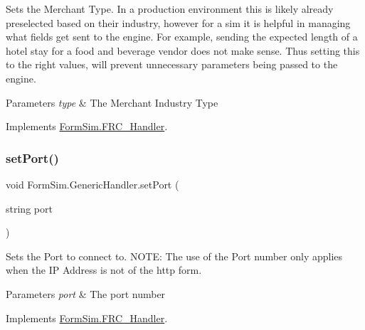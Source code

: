 Sets the Merchant Type. In a production environment this is likely already preselected based on their industry, however for a sim it is helpful in managing what fields get sent to the engine. For example, sending the expected length of a hotel stay for a food and beverage vendor does not make sense. Thus setting this to the right values, will prevent unnecessary parameters being passed to the engine. 


\begin{DoxyParams}{Parameters}
{\em type} & The Merchant Industry Type\\
\hline
\end{DoxyParams}


Implements \mbox{\hyperlink{interface_form_sim_1_1_f_r_c___handler_a23a2917fb9455954723cd3982b31b76c}{Form\+Sim.\+F\+R\+C\+\_\+\+Handler}}.

\mbox{\label{class_form_sim_1_1_generic_handler_ad22f25ee6f474e2ac46361add5ca7f97}} 
\subsubsection{\texorpdfstring{set\+Port()}{setPort()}}
{\footnotesize\ttfamily void Form\+Sim.\+Generic\+Handler.\+set\+Port (\begin{DoxyParamCaption}\item[{string}]{port }\end{DoxyParamCaption})\hspace{0.3cm}{\ttfamily [inline]}}



Sets the Port to connect to. N\+O\+TE\+: The use of the Port number only applies when the IP Address is not of the http form. 


\begin{DoxyParams}{Parameters}
{\em port} & The port number\\
\hline
\end{DoxyParams}


Implements \mbox{\hyperlink{interface_form_sim_1_1_f_r_c___handler_a0a0a83b20fd2b3ec4ef9bbe5f5549b35}{Form\+Sim.\+F\+R\+C\+\_\+\+Handler}}.

\mbox{\label{class_form_sim_1_1_generic_handler_affac9485687a2be1595405d657922532}} 

